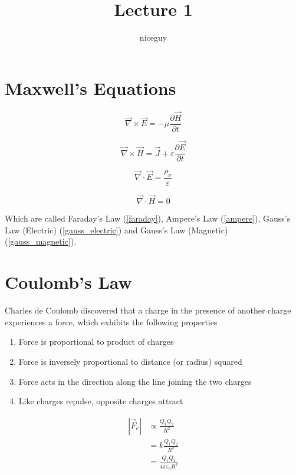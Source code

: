 \documentclass[12pt]{article}
\author{niceguy}
\title{Lecture 1}
\begin{document}
\maketitle

\section{Maxwell's Equations}

\begin{equation} \label{faraday}
	\vec{\nabla} \times \vec{E} = -\mu \frac{\partial \vec{H}}{\partial t}
\end{equation}

\begin{equation} \label{ampere}
	\vec{\nabla} \times \vec{H} = \vec{J} + \varepsilon \frac{\partial \vec{E}}{\partial t}
\end{equation}

\begin{equation} \label{gauss_electric}
	\vec{\nabla} \cdot \vec{E} = \frac{\rho_\nu}{\varepsilon}
\end{equation}

\begin{equation} \label{gauss_magnetic}
	\vec{\nabla} \cdot \vec{H} = 0
\end{equation}

Which are called Faraday's Law (\ref{faraday}), Ampere's Law (\ref{ampere}), Gauss's Law (Electric) (\ref{gauss_electric}) and Gauss's Law (Magnetic) (\ref{gauss_magnetic}).

\section{Coulomb's Law}

Charles de Coulomb discovered that a charge in the presence of another charge experiences a force, which exhibits the following properties

\begin{enumerate}
	\item Force is proportional to product of charges
	\item Force is inversely proportional to distance (or radius) squared
	\item Force acts in the direction along the line joining the two charges
	\item Like charges repulse, opposite charges attract
\end{enumerate}

\begin{align*}
	|\vec{F}_e| &\propto \frac{Q_1Q_2}{R^2} \\
		    &= k\frac{Q_1Q_2}{R^2} \\
		    &= \frac{Q_1Q_2}{4\pi\varepsilon_0R^2}
\end{align*}
\end{document}
